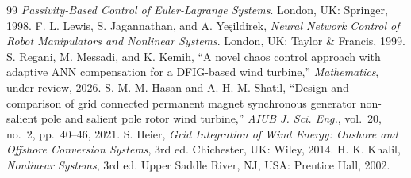 \documentclass[conference]{IEEEtran}
\begin{document}
\begin{thebibliography}{99}
\emph{Passivity-Based Control of Euler-Lagrange Systems}. London, UK: Springer, 1998.
 F. L. Lewis, S. Jagannathan, and A. Ye\c{s}ildirek, \emph{Neural Network Control of
Robot Manipulators and Nonlinear Systems}. London, UK: Taylor \& Francis, 1999.
 S. Regani, M. Messadi, and K. Kemih, ``A novel chaos control approach with
adaptive ANN compensation for a DFIG-based wind turbine,'' \emph{Mathematics}, under review, 2026.
 S. M. M. Hasan and A. H. M. Shatil, ``Design and comparison of grid connected
permanent magnet synchronous generator non-salient pole and salient pole rotor wind turbine,''
\emph{AIUB J. Sci. Eng.}, vol.~20, no.~2, pp.~40--46, 2021.
 S. Heier, \emph{Grid Integration of Wind Energy: Onshore and Offshore Conversion
Systems}, 3rd ed. Chichester, UK: Wiley, 2014.
 H. K. Khalil, \emph{Nonlinear Systems}, 3rd ed. Upper Saddle River, NJ, USA:
Prentice Hall, 2002.
\end{thebibliography}
\end{document}

